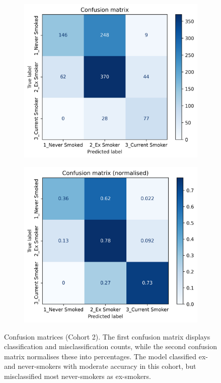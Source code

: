 \documentclass{article} %
\begin{document}
\begin{figure}[htb]
    \centering
    \begin{subfigure}{0.49\linewidth}
        \centering
        \includegraphics[width=\linewidth]{cohort2/test_confusion_matrix.png}
    \end{subfigure}
    \hfill
    \begin{subfigure}{0.49\linewidth}
        \centering
        \includegraphics[width=\linewidth]{cohort2/test_confusion_matrix_normalised.png}
    \end{subfigure}
    \caption[Confusion matrices (Cohort 2)]{Confusion matrices (Cohort 2). The first confusion matrix displays classification and misclassification counts, while the second confusion matrix normalises these into percentages. The model classified ex- and never-smokers with moderate accuracy in this cohort, but misclassified most never-smokers as ex-smokers.}
    \label{fig:cohort2-confusion-matrix}
\end{figure}
\end{document}
